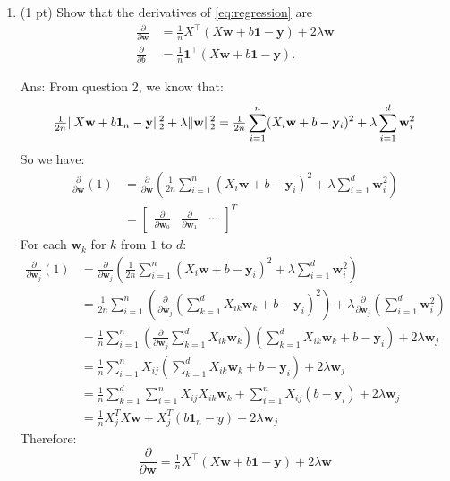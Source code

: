 \documentclass[10pt,letter,notitlepage]{article}
\newcommand{\one}{\mathbf{1}}
\newcommand{\wv}{\mathbf{w}}
\newcommand{\yv}{\mathbf{y}}
\newcommand{\ans}[1]{{\color{orange}\textsf{Ans}: #1}}
\newcounter{exercise}
\begin{document}
\begin{exercise}
\begin{enumerate}
\item (1 pt) Show that the derivatives of \ref{eq:regression} are
\begin{align}
\frac{\partial}{\partial\wv} &=  \tfrac1n X^\top (X\wv + b\one - \yv) + 2 \lambda \wv\\
\label{eq:b}
\frac{\partial}{\partial b} &= \tfrac1n \one^\top (X\wv + b\one - \yv).
\end{align}

    \ans{
      From question 2, we know that:
      $$
        \tfrac{1}{2n} \|X \wv+ b\one_n - \yv\|_2^2 + \lambda \|\wv\|_2^2
        =
        \tfrac{1}{2n} \sum_{i=1}^n (X_i\wv + b - \yv_i)^2 + \lambda \sum_{i=1}^d \wv_i^2 \\
      $$
      \color{orange}
      So we have:
      \begin{align*}
        \frac{\partial}{\partial\wv} (1)&= \frac{\partial}{\partial\wv} \left(\tfrac{1}{2n} \sum_{i=1}^n (X_i\wv + b - \yv_i)^2 + \lambda \sum_{i=1}^d \wv_i^2\right) \\
        &= \begin{bmatrix} \frac{\partial}{\partial\wv_0} & \frac{\partial}{\partial\wv_1} & \cdots \end{bmatrix}^T
      \end{align*}
      For each $\wv_k$ for $k$ from $1$ to $d$:
      \begin{align*}
        \frac{\partial}{\partial\wv_j} (1)&= \frac{\partial}{\partial\wv_j} \left(\tfrac{1}{2n} \sum_{i=1}^n (X_i\wv + b - \yv_i)^2 + \lambda \sum_{i=1}^d \wv_i^2\right) \\
        &=
        \tfrac{1}{2n} \sum_{i=1}^n \left(\frac{\partial}{\partial\wv_j} (\sum_{k=1}^d X_{ik}\wv_k + b - \yv_i)^2\right) +
        \lambda \frac{\partial}{\partial\wv_j} \left(\sum_{i=1}^d \wv_i^2\right) \\
        &= 
        \tfrac{1}{n} \sum_{i=1}^n \left(\frac{\partial}{\partial\wv_j} \sum_{k=1}^d X_{ik}\wv_k\right)\left(\sum_{k=1}^d X_{ik}\wv_k + b - \yv_i\right) + 
        2\lambda \wv_j \\
        &=
        \tfrac{1}{n} \sum_{i=1}^n X_{ij}\left(\sum_{k=1}^d X_{ik}\wv_k + b - \yv_i\right) + 
        2\lambda \wv_j \\
        &= \tfrac{1}{n} \sum_{k=1}^d \sum_{i=1}^n X_{ij}X_{ik}\wv_k + \sum_{i=1}^nX_{ij}(b - \yv_i) + 2\lambda \wv_j \\
        &= \tfrac{1}{n}X^T_jX\wv+X^T_j(b\one_n-y) + 2\lambda \wv_j
      \end{align*}
      Therefore: 
      $$\frac{\partial}{\partial\wv} = \tfrac1n X^\top (X\wv + b\one - \yv) + 2 \lambda \wv$$
}
\end{enumerate}
\end{exercise}
\end{document}
